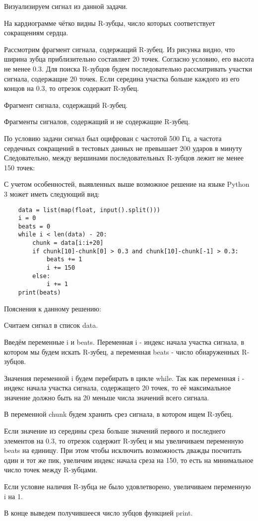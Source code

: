 \solutionSection

Визуализируем сигнал из данной задачи.

На кардиограмме чётко видны R-зубцы, число которых соответствует сокращениям сердца.


Рассмотрим фрагмент сигнала, содержащий R-зубец. Из рисунка видно, что ширина зубца приблизительно составляет 20 точек. Согласно условию, его высота не менее 0.3. Для поиска R-зубцов будем последовательно рассматривать участки сигнала, содержащие 20 точек. Если середина участка больше каждого из его концов на 0.3, то отрезок содержит R-зубец.

Фрагмент сигнала, содержащий R-зубец.


Фрагменты сигналов, содержащий и не содержащие R-зубец.


По условию задачи сигнал был оцифрован с частотой 500 Гц, а частота сердечных сокращений в тестовых данных не превышает 200 ударов в минуту
Следовательно, между вершинами последовательных R-зубцов лежит не менее 150 точек:


С учетом особенностей, выявленных выше возможное решение на языке Python 3 может иметь следующий вид:

\begin{verbatim}
    data = list(map(float, input().split()))
    i = 0
    beats = 0
    while i < len(data) - 20:
        chunk = data[i:i+20]
        if chunk[10]-chunk[0] > 0.3 and chunk[10]-chunk[-1] > 0.3: 
            beats += 1            
            i += 150          
        else:
            i += 1
    print(beats)
\end{verbatim}

Пояснения к данному решению:

Считаем сигнал в список data.

Введём переменные i и beats. Переменная i - индекс начала участка сигнала, в котором мы будем искать R-зубец, а переменная beats - число обнаруженных R-зубцов.

Значения переменной i будем перебирать в цикле while. Так как переменная i - индекс начала участка сигнала, содержащего 20 точек, то её максимальное значение должно быть на 20 меньше числа значений всего сигнала.

В переменной chunk будем хранить срез сигнала, в котором ищем R-зубец.

Если значение из середины среза больше значений первого и последнего элементов на 0.3, то отрезок содержит R-зубец и мы увеличиваем переменную beats на единицу. При этом чтобы исключить возможность дважды посчитать один и тот же пик, увеличим индекс начала среза на 150, то есть на минимальное число точек между R-зубцами.

Если условие наличия R-зубца не было удовлетворено, увеличиваем переменную i на 1.

В конце выведем получившееся число зубцов функцией print.


